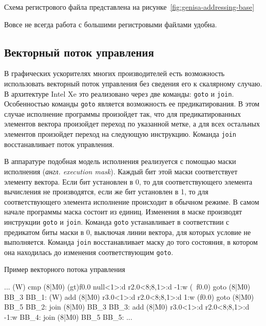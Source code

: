 Схема регистрового файла представлена на рисунке~\cref{fig:genisa-addressing-base}

Вовсе не всегда работа с большими регистровыми файлами удобна.

\subsection{Векторный поток управления}\label{subsec:overview/logical/simdcf}

В графических ускорителях многих производителей есть возможность использовать векторный поток управления без сведения его к скалярному случаю. В архитектуре Intel Xe это реализовано через две команды: \texttt{goto} и \texttt{join}. Особенностью команды \texttt{goto} является возможность ее предикатирования. В этом случае исполнение программы произойдет так, что для предикатированных элементов вектора произойдет переход по указанной метке, а для всех остальных элементов произойдет переход на следующую инструкцию. Команда \texttt{join} восстанавливает поток управления.

В аппаратуре подобная модель исполнения реализуется с помощью маски исполнения (\textit{англ. execution mask}). Каждый бит этой маски соответствует элементу вектора. Если бит установлен в 0, то для соответствующего элемента вычисления не производятся, если же бит установлен в 1, то для соответствующего элемента исполнение происходит в обычном режиме. В самом начале программы маска состоит из единиц. Изменения в маске производят инструкции \texttt{goto} и \texttt{join}. Команда \texttt{goto} устанавливает в соответствии с предикатом биты маски в 0, выключая линии вектора, для которых условие не выполняется. Команда \texttt{join} восстанавливает маску до того состояния, в котором она находилась до изменения соответствующим \texttt{goto}.

\begin{ListingEnv}[!h]
    \captiondelim{ } 
    \caption{Пример векторного потока управления}\label{lst:simdcf}
    \begin{Verb}
  ...
  (W)     cmp  (8|M0)  (gt)f0.0  null<1>:d  r2.0<8;8,1>:d -1:w
  (~f0.0) goto (8|M0)            BB_3
  BB_1:
  (W)     add  (8|M0)            r3.0<1>:d  r2.0<8;8,1>:d  1:w
  (f0.0)  goto (8|M0)            BB_5
  BB_2:
          join (8|M0)            BB_3
  BB_3:
          add  (8|M0)            r3.0<1>:d  r2.0<8;8,1>:d -1:w
  BB_4:
          join (8|M0)            BB_5
  BB_5:
  ...
    \end{Verb}
\end{ListingEnv}

